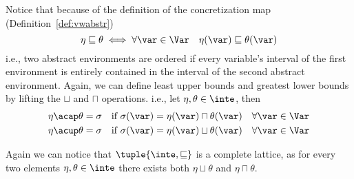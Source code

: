 Notice that because of the definition of the concretization map
(Definition~\ref{def:vwabstr})
\begin{equation*}
  \eta \sqsubseteq \theta \iff \forall \var \in \Var \quad \eta(\var) \sqsubseteq \theta(\var)
\end{equation*}
i.e., two abstract environments are ordered if every variable's
interval of the first environment is entirely contained in the
interval of the second abstract environment.  Again, we can define
least upper bounds and greatest lower bounds by lifting the \(\sqcup\)
and \(\sqcap\) operations. i.e., let \(\eta, \theta \in \inte\), then
\begin{align*}
  \eta \acap \theta = \sigma & \quad \text{if } \sigma(\var) = \eta(\var) \sqcap \theta(\var) \quad \forall \var\in\Var \\
  \eta \acup \theta = \sigma & \quad \text{if } \sigma(\var) = \eta(\var) \sqcup \theta(\var) \quad \forall \var\in\Var
\end{align*}

Again we can notice that \(\tuple{\inte, \sqsubseteq}\) is a complete
lattice, as for every two elements \(\eta,\theta\in\inte\) there
exists both \(\eta \sqcup \theta\) and \(\eta \sqcap \theta\).
